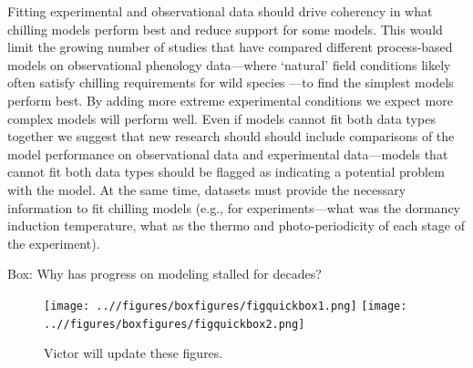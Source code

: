 \documentclass[11pt]{article}
\begin{document}
Fitting experimental and observational data should drive coherency in what chilling models perform best and reduce support for some models. This would limit the growing number of studies that have compared different process-based models on observational phenology data---where `natural' field conditions likely often satisfy chilling requirements for wild species \citep{basler2016evaluating,hufkens2018integrated}---to find the simplest models perform best. By adding more extreme experimental conditions we expect more complex models will perform well. Even if models cannot fit both data types together we suggest that new research should should include comparisons of the model performance on observational data and experimental data---models that cannot fit both data types should be flagged as indicating a potential problem with the model.  At the same time, datasets must provide the necessary information to fit chilling models (e.g., for experiments---what was the dormancy induction temperature, what as the thermo and photo-periodicity of each stage of the experiment). 




\vspace{10ex}
{\sc Box: Why has progress on modeling stalled for decades?} %

\begin{figure}[h!]
\texttt{[image: ..//figures/boxfigures/figquickbox1.png]}
\texttt{[image: ..//figures/boxfigures/figquickbox2.png]}
\caption{Victor will update these figures.} 
\label{fig:boxy}
\end{figure}

\end{document}
